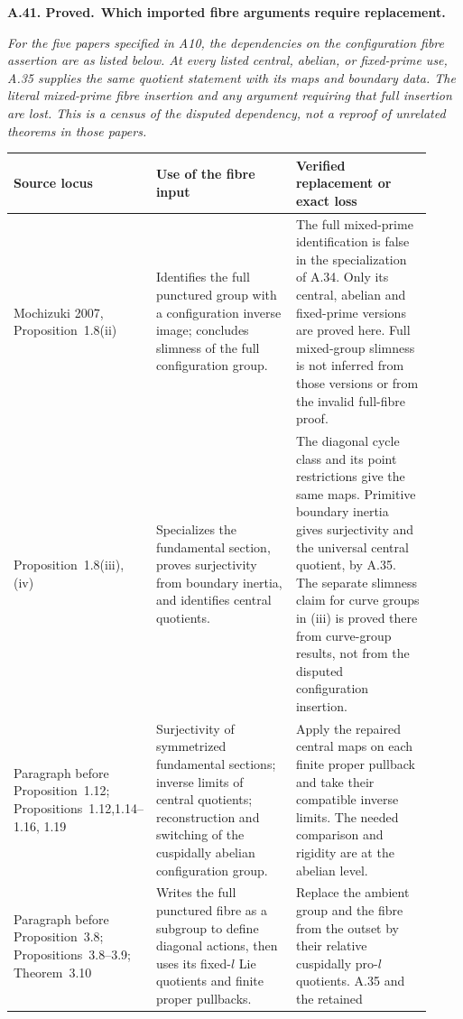 \documentclass[11pt,a4paper]{article}
\newenvironment{claim}[3]{\par\medskip\noindent\hypertarget{#1}{\textbf{#1. #2.}}\ \textbf{#3.}\par\nopagebreak\smallskip\begingroup\itshape}{\endgroup\par\smallskip}
\begin{document}
\begin{claim}{A.41}{Proved}{Which imported fibre arguments require replacement}
For the five papers specified in A10, the dependencies on the
configuration fibre assertion are as listed below. At every
listed central, abelian, or fixed-prime use, A.35 supplies the
same quotient statement with its maps and boundary data. The
literal mixed-prime fibre insertion and any argument requiring
that full insertion are lost. This is a census of the disputed
dependency, not a reproof of unrelated theorems in those papers.
\end{claim}
\begin{center}\small
\begin{longtable}{p{0.23\linewidth}p{0.35\linewidth}p{0.34\linewidth}}
\toprule
Source locus&Use of the fibre input&Verified replacement or exact loss\\\midrule
Mochizuki 2007, Proposition~1.8(ii)&
Identifies the full punctured group with a configuration inverse
image; concludes slimness of the full configuration group.&
The full mixed-prime identification is false in the specialization
of A.34. Only its central, abelian and fixed-prime versions are
proved here. Full mixed-group slimness is not inferred from those
versions or from the invalid full-fibre proof.\\
Proposition~1.8(iii),(iv)&
Specializes the fundamental section, proves surjectivity from
boundary inertia, and identifies central quotients.&
The diagonal cycle class and its point restrictions give the
same maps. Primitive boundary inertia gives surjectivity and
the universal central quotient, by A.35. The separate slimness
claim for curve groups in (iii) is proved there from curve-group
results, not from the disputed configuration insertion.\\
Paragraph before Proposition~1.12; Propositions~1.12,1.14--1.16,
1.19&
Surjectivity of symmetrized fundamental sections; inverse limits
of central quotients; reconstruction and switching of the
cuspidally abelian configuration group.&
Apply the repaired central maps on each finite proper pullback
and take their compatible inverse limits. The needed comparison
and rigidity are at the abelian level.\\
Paragraph before Proposition~3.8; Propositions~3.8--3.9;
Theorem~3.10&
Writes the full punctured fibre as a subgroup to define diagonal
actions, then uses its fixed-$l$ Lie quotients and finite proper
pullbacks.&
Replace the ambient group and the fibre from the outset by their
relative cuspidally pro-$l$ quotients. A.35 and the retained

\end{longtable}
\end{center}
\end{document}
